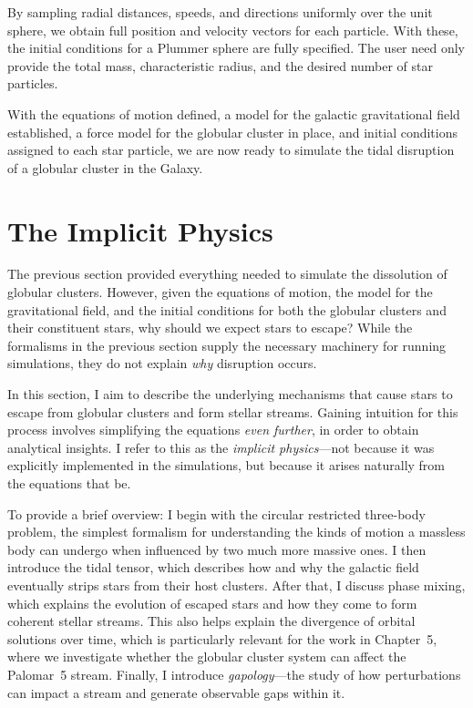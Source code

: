             By sampling radial distances, speeds, and directions uniformly over the unit sphere, we obtain full position and velocity vectors for each particle. With these, the initial conditions for a Plummer sphere are fully specified. The user need only provide the total mass, characteristic radius, and the desired number of star particles.


            With the equations of motion defined, a model for the galactic gravitational field established, a force model for the globular cluster in place, and initial conditions assigned to each star particle, we are now ready to simulate the tidal disruption of a globular cluster in the Galaxy.



\section{The Implicit Physics}
    The previous section provided everything needed to simulate the dissolution of globular clusters. However, given the equations of motion, the model for the gravitational field, and the initial conditions for both the globular clusters and their constituent stars, why should we expect stars to escape? While the formalisms in the previous section supply the necessary machinery for running simulations, they do not explain \textit{why} disruption occurs.

    In this section, I aim to describe the underlying mechanisms that cause stars to escape from globular clusters and form stellar streams. Gaining intuition for this process involves simplifying the equations \textit{even further}, in order to obtain analytical insights. I refer to this as the \textit{implicit physics}—not because it was explicitly implemented in the simulations, but because it arises naturally from the equations that be.

    To provide a brief overview: I begin with the circular restricted three-body problem, the simplest formalism for understanding the kinds of motion a massless body can undergo when influenced by two much more massive ones. I then introduce the tidal tensor, which describes how and why the galactic field eventually strips stars from their host clusters. After that, I discuss phase mixing, which explains the evolution of escaped stars and how they come to form coherent stellar streams. This also helps explain the divergence of orbital solutions over time, which is particularly relevant for the work in Chapter~5, where we investigate whether the globular cluster system can affect the Palomar~5 stream. Finally, I introduce \textit{gapology}—the study of how perturbations can impact a stream and generate observable gaps within it.

